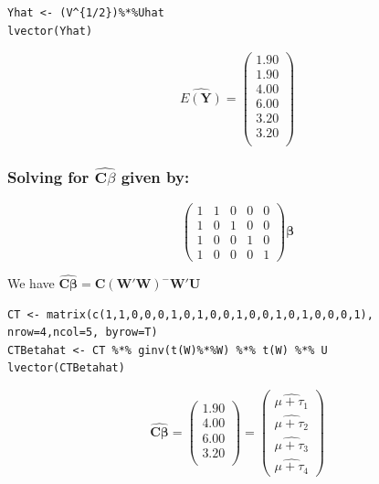 \documentclass[11pt]{article}
\begin{document}
\begin{verbatim}
Yhat <- (V^{1/2})%*%Uhat
lvector(Yhat)
\end{verbatim}

\[
\hat{E(\mathbf{Y})} =
\begin{pmatrix}{}
  1.90 \\ 
  1.90 \\ 
  4.00 \\ 
  6.00 \\ 
  3.20 \\ 
  3.20 \\ 
  \end{pmatrix}
\]
\subsubsection{Solving for $\widehat{\mathbf{C}\beta}$ given by:}
\label{sec-2-1-2}


\[
\begin{pmatrix}
1 & 1 & 0 & 0 & 0 \\
1 & 0 & 1 & 0 & 0 \\
1 & 0 & 0 & 1 & 0 \\
1 & 0 & 0 & 0 & 1 
\end{pmatrix}\mathbf{\beta}
\]

We have $\widehat{\mathbf{C\beta}} = \mathbf{C}(\mathbf{W}'\mathbf{W})^{-}\mathbf{W}'\mathbf{U}$


\begin{verbatim}
CT <- matrix(c(1,1,0,0,0,1,0,1,0,0,1,0,0,1,0,1,0,0,0,1), nrow=4,ncol=5, byrow=T)
CTBetahat <- CT %*% ginv(t(W)%*%W) %*% t(W) %*% U
lvector(CTBetahat)
\end{verbatim}

\[
\widehat{\mathbf{C}\mathbf{\beta}} =
\begin{pmatrix}{}
  1.90 \\ 
  4.00 \\ 
  6.00 \\ 
  3.20 \\ 
  \end{pmatrix} =
\begin{pmatrix}
\widehat{\mu + \tau_1} \\
\widehat{\mu + \tau_2} \\
\widehat{\mu + \tau_3} \\
\widehat{\mu + \tau_4}
\end{pmatrix}
\]
\end{document}

